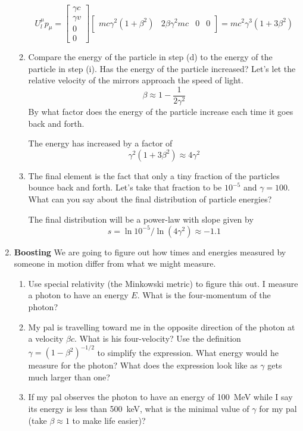 \documentclass[pdftex,10pt]{article}
\begin{document}
\begin{enumerate}
\begin{enumerate}
$$
U^\mu_l p_\mu =
 \left [ \begin{array}{c} \gamma c \\ \gamma v \\ 0 \\ 0 \end{array}
  \right ]
\left [ \begin{array}{cccc}  m c \gamma^2 (1+\beta^2) & 
2 \beta \gamma^2 mc & 0 & 0 \end{array}
  \right ] = m c^2 \gamma^3 \left ( 1 + 3 \beta^2 \right)
$$

\item Compare the energy of the particle in step (d) to the
  energy of the particle in step (i).  Has the energy of the particle
  increased?  Let's let the relative velocity of the mirrors approach
  the speed of light.
$$
\beta \approx 1 - \frac{1}{2\gamma^2}
$$
  By what factor does the energy of the particle increase each time it
  goes back and forth.

The energy has increased by a factor of
$$
\gamma^2 \left ( 1 + 3 \beta^2 \right ) \approx 4 \gamma^2
$$
\item  The final element is the fact that only a tiny
  fraction of the particles bounce back and forth.  Let's take that
  fraction to be $10^{-5}$ and $\gamma=100$.  What can you say about
  the final distribution of particle energies?

The final distribution will be a power-law with slope given by
$$
s = \ln 10^{-5} / \ln ( 4 \gamma^2) \approx -1.1
$$
\end{enumerate}
\item{\bf Boosting}
We are going to figure out how times and energies measured by someone in motion differ from what we might measure.
\begin{enumerate}

\item Use special relativity (the Minkowski metric) to figure this
  out. I measure a photon to have an energy $E$. What is the
  four-momentum of the photon?

\item My pal is travelling toward me in the opposite direction of the
  photon at a velocity $\beta c$. What is his four-velocity? Use the
  definition $\gamma = \left ( 1- \beta^2\right)^{-1/2}$ to simplify
  the expression. What energy would he measure for the photon? What
  does the expression look like as $\gamma$ gets much larger than one?

\item If my pal observes the photon to have an energy of 100~MeV while
  I say its energy is less than 500~keV, what is the minimal value of
  $\gamma$ for my pal (take $\beta \approx 1$ to make life easier)?


\end{enumerate}
\end{enumerate}
\end{document}
